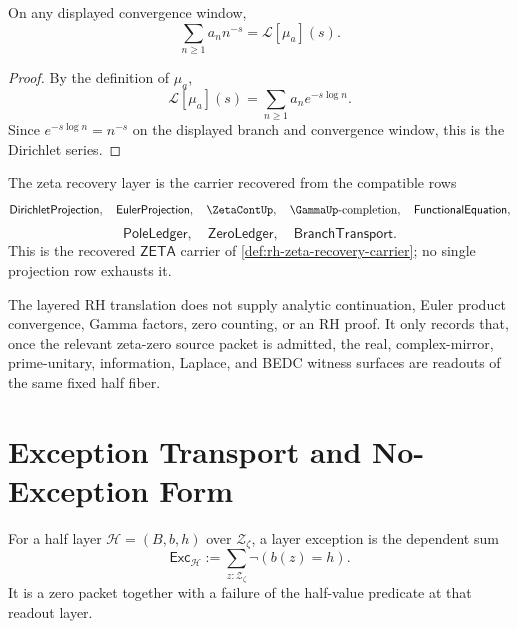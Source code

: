 \begin{proposition}
\label{prop:rh-layered-dirichlet-laplace-readout}
On any displayed convergence window,
$$
\sum_{n\ge 1}a_n n^{-s}
=
\mathcal L[\mu_a](s).
$$
\end{proposition}

\begin{proof}
By the definition of $\mu_a$,
$$
\mathcal L[\mu_a](s)
=
\sum_{n\ge 1}a_n e^{-s\log n}.
$$
Since $e^{-s\log n}=n^{-s}$ on the displayed branch and convergence
window, this is the Dirichlet series.
\end{proof}

\begin{definition}
\label{def:rh-layered-zeta-recovery-layer}
The zeta recovery layer is the carrier recovered from the compatible rows
$$
\mathsf{DirichletProjection},\quad
\mathsf{EulerProjection},\quad
\ZetaContUp,\quad
\GammaUp\text{-completion},\quad
\mathsf{FunctionalEquation},
$$
$$
\mathsf{PoleLedger},\quad
\mathsf{ZeroLedger},\quad
\mathsf{BranchTransport}.
$$
This is the recovered $\mathsf{ZETA}$ carrier of
\autoref{def:rh-zeta-recovery-carrier}; no single projection row exhausts
it.
\end{definition}

\begin{principle}
\label{prin:rh-layered-translation-no-analytic-supply}
The layered RH translation does not supply analytic continuation, Euler
product convergence, Gamma factors, zero counting, or an RH proof. It only
records that, once the relevant zeta-zero source packet is admitted, the
real, complex-mirror, prime-unitary, information, Laplace, and BEDC witness
surfaces are readouts of the same fixed half fiber.
\end{principle}

\section{Exception Transport and No-Exception Form}
\label{sec:rh-layered-exception-transport}

\begin{definition}
\label{def:rh-layered-layer-exception}
For a half layer $\mathcal H=(B,b,h)$ over $\mathcal Z_{\zeta}$, a layer
exception is the dependent sum
$$
\mathsf{Exc}_{\mathcal H}
:=
\sum_{z:\mathcal Z_{\zeta}}\neg(b(z)=h).
$$
It is a zero packet together with a failure of the half-value predicate at
that readout layer.
\end{definition}

